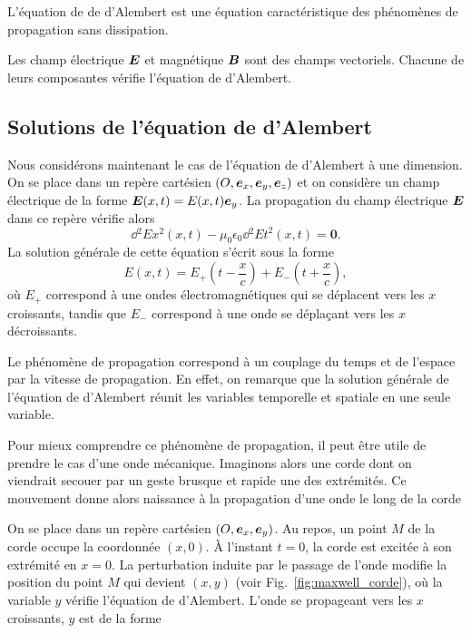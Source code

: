 \begin{rema}
	L'équation de de d'Alembert est une équation caractéristique des phénomènes
	de propagation sans dissipation.
\end{rema}

Les champ électrique $\vece$ et magnétique $\vecb$ sont des champs vectoriels.
Chacune de leurs composantes vérifie l'équation de d'Alembert.

\subsection{Solutions de l'équation de d'Alembert}
Nous considérons maintenant le cas de l'équation de d'Alembert à une dimension.
On se place dans un repère cartésien $(O, \ex, \ey, \ez)$ et on considère
un champ électrique de la forme $\vece(x, t) = E(x, t)\ey$.
La propagation du champ électrique $\vece$ dans ce repère vérifie alors 
\begin{equation*}
	\dd{^2 E}{x^2}(x, t) - \mu_0 \epsilon_0 \dd{^2 E}{t^2}(x, t) = \mathbf{0}.
\end{equation*}
La solution générale de cette équation s'écrit sous la forme
\begin{equation*}
	E(x, t) = E_+\left(t - \frac{x}{c}\right) + E_- \left(t + \frac{x}{c}\right),
\end{equation*}
où $E_+$ correspond à une ondes électromagnétiques qui se déplacent vers 
les $x$ croissants, tandis que $E_-$ correspond à une onde se déplaçant vers 
les $x$ décroissants.

\begin{rema}
	Le phénomène de propagation correspond à un couplage du temps et 
	de l'espace par la vitesse de propagation. En effet, on remarque que 
	la solution générale de l'équation de d'Alembert réunit les variables
	temporelle et spatiale en une seule variable.
\end{rema}

Pour mieux comprendre ce phénomène de propagation, il peut être utile de prendre
le cas d'une onde mécanique. Imaginons alors une corde dont on viendrait secouer par un
geste brusque et rapide une des extrémités. Ce mouvement donne alors naissance
à la propagation d'une onde le long de la corde


On se place dans un repère cartésien $(O, \ex, \ey)$. 
 Au repos, un point $M$ de la corde occupe la coordonnée $(x, 0)$.
À l'instant $t = 0$, la corde est excitée à son extrémité en 
$x = 0$. La perturbation induite par le passage de l'onde modifie la position
du point $M$ qui devient $(x, y)$ (voir Fig.~\ref{fig:maxwell_corde}), 
où la variable $y$ vérifie l'équation de 
d'Alembert. L'onde se propageant vers les $x$ croissants, $y$ est de la forme

